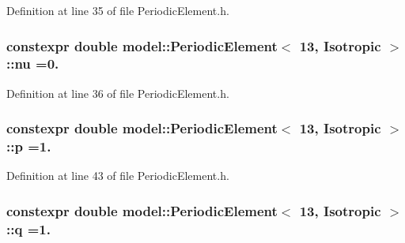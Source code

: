 Definition at line 35 of file Periodic\+Element.\+h.

\hypertarget{structmodel_1_1_periodic_element_3_0113_00_01_isotropic_01_4_ac2d3b397eeffc9d99cceea2c4d1098c8}{}
\subsubsection[{nu}]{\setlength{\rightskip}{0pt plus 5cm}constexpr double {\bf model\+::\+Periodic\+Element}$<$ 13, {\bf Isotropic} $>$\+::nu =0.\hspace{0.3cm}{\ttfamily [static]}}\label{structmodel_1_1_periodic_element_3_0113_00_01_isotropic_01_4_ac2d3b397eeffc9d99cceea2c4d1098c8}


Definition at line 36 of file Periodic\+Element.\+h.

\hypertarget{structmodel_1_1_periodic_element_3_0113_00_01_isotropic_01_4_a077e6a309fb301fe06b59bc87f2f13a6}{}
\subsubsection[{p}]{\setlength{\rightskip}{0pt plus 5cm}constexpr double {\bf model\+::\+Periodic\+Element}$<$ 13, {\bf Isotropic} $>$\+::p =1.\hspace{0.3cm}{\ttfamily [static]}}\label{structmodel_1_1_periodic_element_3_0113_00_01_isotropic_01_4_a077e6a309fb301fe06b59bc87f2f13a6}


Definition at line 43 of file Periodic\+Element.\+h.

\hypertarget{structmodel_1_1_periodic_element_3_0113_00_01_isotropic_01_4_aa21c8bf1bbe6a133bf4d79dfaeebb33f}{}
\subsubsection[{q}]{\setlength{\rightskip}{0pt plus 5cm}constexpr double {\bf model\+::\+Periodic\+Element}$<$ 13, {\bf Isotropic} $>$\+::q =1.\hspace{0.3cm}{\ttfamily [static]}}\label{structmodel_1_1_periodic_element_3_0113_00_01_isotropic_01_4_aa21c8bf1bbe6a133bf4d79dfaeebb33f}


